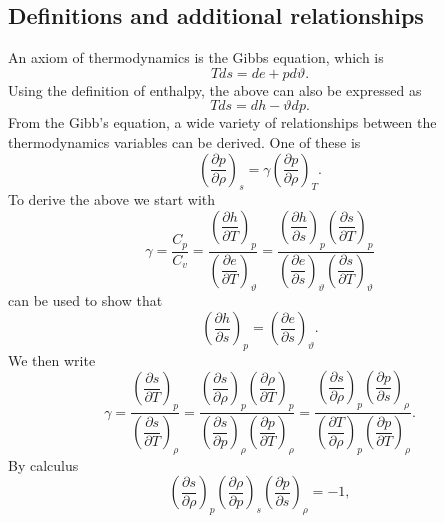 \documentclass[oneside,a4paper,11pt]{report}
\begin{document}
\subsection{Definitions and additional relationships}
An axiom of thermodynamics is the Gibbs equation, which is
\begin{equation}
\label{eq:gibbs_form_1}
    Tds = de + pd\vartheta.
\end{equation}
Using the definition of enthalpy, the above can also be expressed as
\begin{equation}
\label{eq:gibbs_form_2}
    Tds = dh - \vartheta dp.
\end{equation}
From the Gibb's equation, a wide variety of relationships between the thermodynamics variables can be derived. One of these is
\begin{equation}
\label{eq:thermo_relationship_for_sos}
    \left(\frac{\partial p}{\partial \rho} \right)_s = \gamma \left ( \frac{\partial p}{\partial \rho} \right)_T.
\end{equation}
To derive the above we start with
\begin{equation}
    \gamma = \frac{C_p}{C_v} = \frac{ \left(\dfrac{\partial h}{\partial T}\right)_p }{ \left ( \dfrac{\partial e}{\partial T} \right)_\vartheta } = \frac{ \left(\dfrac{\partial h}{\partial s}\right)_p \left(\dfrac{\partial s}{\partial T}\right)_p }{ \left ( \dfrac{\partial e}{\partial s} \right)_\vartheta \left ( \dfrac{\partial s}{\partial T} \right)_\vartheta}
\end{equation}
 can be used to show that 
\begin{equation}
    \left(\dfrac{\partial h}{\partial s}\right)_p = \left ( \dfrac{\partial e}{\partial s} \right)_\vartheta .
\end{equation}
We then write
\begin{equation}
\gamma = \frac{ \left( \dfrac{\partial s}{\partial T} \right)_p}{ \left( \dfrac{\partial s}{\partial T} \right)_\rho } = \frac{ \left(\dfrac{\partial s}{\partial \rho} \right)_p \left(\dfrac{\partial \rho}{\partial T} \right)_p }{ \left(\dfrac{\partial s}{\partial p} \right)_\rho \left(\dfrac{\partial p}{\partial T} \right)_\rho} = \frac{ \left(\dfrac{\partial s}{\partial \rho} \right)_p \left(\dfrac{\partial p}{\partial s} \right)_\rho }{ \left(\dfrac{\partial T}{\partial \rho} \right)_p \left(\dfrac{\partial p}{\partial T} \right)_\rho}.
\end{equation}
By calculus
\begin{equation}
    \left( \frac{\partial s}{\partial \rho} \right)_p \left( \frac{\partial \rho}{\partial p} \right)_s \left( \frac{\partial p}{\partial s} \right)_\rho = -1,
\end{equation}
\end{document}
